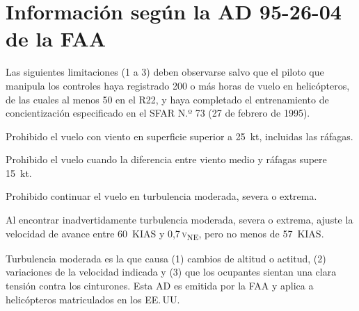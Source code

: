 \section{Información según la AD 95-26-04 de la FAA}
\label{sec:ad9526-lim}

Las siguientes limitaciones (1 a 3) deben observarse salvo que el piloto que manipula los controles haya registrado 200 o más horas de vuelo en helicópteros, de las cuales al menos 50 en el R22, y haya completado el entrenamiento de concientización especificado en el SFAR N.º 73 (27 de febrero de 1995).

\begin{pasos}
\item Prohibido el vuelo con viento en superficie superior a 25~kt, incluidas las ráfagas.
\item Prohibido el vuelo cuando la diferencia entre viento medio y ráfagas supere 15~kt.
\item Prohibido continuar el vuelo en turbulencia moderada, severa o extrema.
\end{pasos}

Al encontrar inadvertidamente turbulencia moderada, severa o extrema, ajuste la velocidad de avance entre 60~KIAS y 0,7\,\textsc{v}\textsubscript{NE}, pero no menos de 57~KIAS.

\begin{nota}
Turbulencia moderada es la que causa (1) cambios de altitud o actitud, (2) variaciones de la velocidad indicada y (3) que los ocupantes sientan una clara tensión contra los cinturones. Esta AD es emitida por la FAA y aplica a helicópteros matriculados en los EE.\,UU.
\end{nota}
